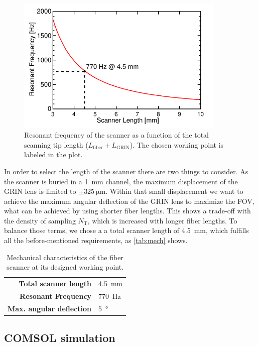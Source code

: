 \begin{figure}[h!]\centering
      \includegraphics[width=10cm]{figures/30_DesignSimulation/Mechanical/fres/fres.pdf}
      \caption{Resonant frequency of the scanner as a function of the total scanning tip length ($L_\mathrm{fiber} + L_\mathrm{GRIN}$). The chosen working point is labeled in the plot.}
      \label{fig:freq}
\end{figure}

In order to select the length of the scanner there are two things to consider. As the scanner is buried in a \SI{1}{\milli\meter} channel, the maximum displacement of the GRIN lens is limited to $\pm\SI{325}{\micro\meter}$. Within that small displacement we want to achieve the maximum angular deflection of the GRIN lens to maximize the FOV, what can be achieved by using shorter fiber lengths. This shows a trade-off with the density of sampling $N_\mathrm{T}$, which is increased with longer fiber lengths. To balance those terms, we chose a a total scanner length of \SI{4.5}{\milli\meter}, which fulfills all the before-mentioned requirements, as \autoref{tab:mech} shows. 

\begin{table}[h!]\centering
	\begin{tabular}{rl}\\
		\hline
		\textbf{Total scanner length} & \SI{4.5}{\milli\meter} \\ 
		\textbf{Resonant Frequency} & \SI{770}{\hertz} \\ 
		\textbf{Max. angular deflection} & \SI{5}{\degree} \\ 
		\hline
	\end{tabular} 
    \caption{Mechanical characteristics of the fiber scanner at its designed working point.}
    \label{tab:mech}
\end{table}

\subsection{COMSOL simulation}

